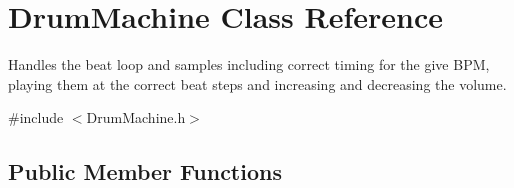 \hypertarget{class_drum_machine}{}\section{Drum\+Machine Class Reference}
\label{class_drum_machine}


Handles the beat loop and samples including correct timing for the give B\+PM, playing them at the correct beat steps and increasing and decreasing the volume.  




{\ttfamily \#include $<$Drum\+Machine.\+h$>$}

\subsection*{Public Member Functions}
